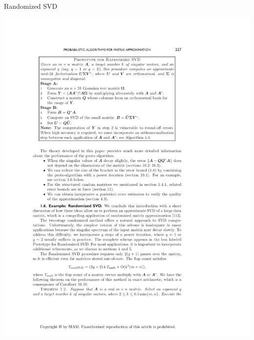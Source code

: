 \begin{frame}[fragile]
\begin{block}{Randomized SVD\footnotemark}
  \begin{minipage}{.51\textwidth}
    \begin{center}
      \includegraphics[width=.95\textwidth]{pics/randSVDalg}
      \\

\end{center}
\end{minipage}
\end{block}
\end{frame}
